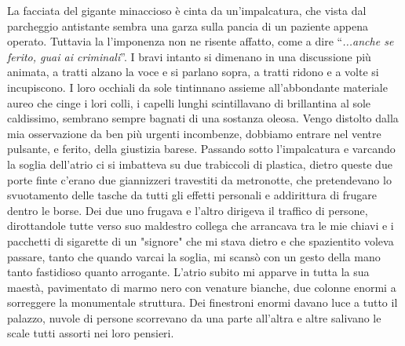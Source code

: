 La facciata del gigante minaccioso è cinta da un'impalcatura, che vista dal parcheggio antistante sembra una garza sulla pancia di un paziente appena operato. Tuttavia la l'imponenza non ne risente affatto, come a dire ``\emph{...anche se ferito, guai ai criminali}''. I bravi intanto si dimenano in una discussione più animata, a tratti alzano la voce e si parlano sopra, a tratti ridono e a volte si incupiscono. I loro occhiali da sole tintinnano assieme all'abbondante materiale aureo che cinge i lori colli, i capelli lunghi scintillavano di brillantina al sole caldissimo, sembrano sempre bagnati di una sostanza oleosa. Vengo distolto dalla mia osservazione da ben più urgenti incombenze, dobbiamo entrare nel ventre pulsante, e ferito, della giustizia barese.\newline\scenechange
Passando sotto l'impalcatura e varcando la soglia dell'atrio ci si imbatteva su due trabiccoli di plastica, dietro queste due porte finte c'erano due giannizzeri travestiti da metronotte, che pretendevano lo svuotamento delle tasche da tutti gli effetti personali e addirittura di frugare dentro le borse. Dei due uno frugava e l'altro dirigeva il traffico di persone, dirottandole tutte verso suo maldestro collega che arrancava tra le mie chiavi e i pacchetti di sigarette di un "signore" che mi stava dietro e che spazientito voleva passare, tanto che quando varcai la soglia, mi scansò con un gesto della mano tanto fastidioso quanto arrogante.\newline
L'atrio subito mi apparve in tutta la sua maestà, pavimentato di marmo nero con venature bianche, due colonne enormi a sorreggere la monumentale struttura. Dei finestroni enormi davano luce a tutto il palazzo, nuvole di persone scorrevano da una parte all'altra e altre salivano le scale tutti assorti nei loro pensieri.

